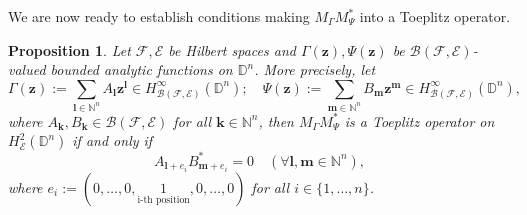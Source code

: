 \documentclass[12pt]{amsart}
\newtheorem{propn}{Proposition}[section]
\theoremstyle{definition}
\newcommand{\Nat}{\mathbb{N}}
\newcommand{\D}{\mathbb{D}}
\newcommand{\1}{{\mbox{\bf 1}}}
\newcommand{\clb}{\mathcal{B}}
\newcommand{\cle}{\mathcal{E}}
\newcommand{\clf}{\mathcal{F}}
\begin{document}
We are now ready to establish conditions making $M_{\Gamma}M_{\Psi}^*$ into a Toeplitz operator.
\begin{propn}\label{main2}
Let $\clf, \cle$ be Hilbert spaces and $\Gamma(\bm{z}), \Psi(\bm{z})$ be $\clb(\clf,\cle)$-valued bounded analytic functions on $\D^n$. More precisely, let
\[
\Gamma(\bm{z}):= \sum_{\bm{l} \in \Nat^n} A_{\bm{l}} \bm{z}^{\bm{l}}  \in H_{\clb(\clf, \cle)}^{\infty}(\D^n); \quad \Psi(\bm{z}):= \sum_{\bm{m} \in \Nat^n} B_{\bm{m}} \bm{z}^{\bm{m}}  \in H_{\clb(\clf, \cle)}^{\infty}(\D^n),
\]
where $A_{\bm{k}}, B_{\bm{k}} \in \clb(\clf,\cle)$ for all $\bm{k} \in \Nat^n$, then $M_{\Gamma}M_{\Psi}^*$ is a Toeplitz operator on $H_{\cle}^2(\D^n)$ if and only if 
\begin{equation}\label{prod}
A_{\bm{l}+ e_i} B_{\bm{m}+ e_i}^* = 0 \quad (\forall \bm{l},\bm{m} \in \Nat^n),
\end{equation}
where $e_i := (0,\ldots,0, \underset{\text{i-th position}}{1},0,\ldots,0)$ for all $i \in \{1,\ldots,n\}$. 
\end{propn}
\end{document}

